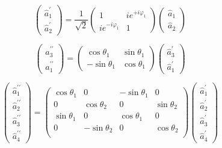 \begin{equation}
	\begin{pmatrix}
		\hat{a}_1^\prime \\
		\hat{a}_2^\prime
	\end{pmatrix}
	=
	\frac{1}{\sqrt{2}}
	\begin{pmatrix}
		 1 & ie^{+i\varphi_1} \\
		 ie^{-i\varphi_1} & 1
	\end{pmatrix}
	\begin{pmatrix}
		\hat{a}_1 \\
		\hat{a}_2
	\end{pmatrix}
\end{equation}

\begin{equation}
	\begin{pmatrix}
		\hat{a}_3^{\prime\prime} \\
		\hat{a}_1^{\prime\prime}
	\end{pmatrix}
	=
	\begin{pmatrix}
		 \cos\theta_1 & \sin\theta_1 \\
		 -\sin\theta_1 & \cos\theta_1
	\end{pmatrix}
	\begin{pmatrix}
		\hat{a}_3^\prime \\
		\hat{a}_1^\prime
	\end{pmatrix}
\end{equation}

\begin{equation}
	\begin{pmatrix}
		\hat{a}_1^{\prime\prime} \\
		\hat{a}_2^{\prime\prime} \\
		\hat{a}_3^{\prime\prime} \\
		\hat{a}_4^{\prime\prime}
	\end{pmatrix}
	=
	\begin{pmatrix}
		 \cos\theta_1 & 0 & -\sin\theta_1 & 0 \\
		 0 & \cos\theta_2 & 0 & \sin\theta_2 \\
		 \sin\theta_1 & 0 & \cos\theta_1 & 0 \\
		 0 & -\sin\theta_2 & 0 & \cos\theta_2 \\
	\end{pmatrix}
	\begin{pmatrix}
		\hat{a}_1^{\prime} \\
		\hat{a}_2^{\prime} \\
		\hat{a}_3^{\prime} \\
		\hat{a}_4^{\prime}
	\end{pmatrix}
\end{equation}

